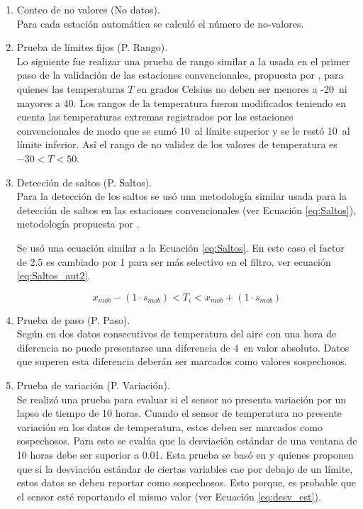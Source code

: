 \begin{enumerate}
\item Conteo de no valores (No datos).\\
	Para cada estación automática se calculó el número de no-valores.

\item Prueba de límites fijos (P. Rango).\\
Lo siguiente fue realizar una prueba de rango similar a la usada en el primer paso de la validación de las estaciones convencionales, propuesta por \citet{estevez2011}, para quienes las temperaturas $T$ en grados Celsius no deben ser menores a -20\celc\ ni mayores a 40\celc. Los rangos de la temperatura fueron modificados teniendo en cuenta las temperaturas extremas registrados por las estaciones convencionales de modo que se sumó 10\celc\ al límite superior y se le restó 10\celc\ al límite inferior. Así el rango de no validez de los valores de temperatura es $-30$\celc $< T < 50$\celc.\\

\item Detección de saltos (P. Saltos).\\
Para la detección de los saltos se usó una metodología similar usada para la detección de saltos en las estaciones convencionales (ver Ecuación \ref{eq:Saltos}), metodología propuesta por \citet{vickers1997}.

Se usó una ecuación similar a la Ecuación \ref{eq:Saltos}. En este caso el factor de 2.5 es cambiado por 1 para ser más selectivo en el filtro, ver ecuación \ref{eq:Saltos_aut2}.

\begin{equation}\label{eq:Saltos_aut2}
	     x_{mob} - (1\cdot{s_{mob}}) < T_{i} < x_{mob} + (1\cdot{s_{mob}}) 
\end{equation}

\item Prueba de paso (P. Paso).\\
Según \citet{estevez2011} en dos datos consecutivos  de temperatura del aire con una hora de diferencia no puede presentarse una diferencia de 4\celc\ en valor absoluto. Datos que superen esta diferencia deberán ser marcados como valores sospechosos.\\

\item Prueba de variación (P. Variación).\\

Se realizó una prueba para evaluar si el sensor no presenta variación por un lapso de tiempo de 10 horas. Cuando el sensor de temperatura no presente variación en los datos de temperatura, estos deben ser marcados como sospechosos. Para esto se evalúa que la desviación estándar de una ventana de 10 horas debe ser superior a 0.01. Esta prueba  se basó en \citet{zahumensky2004} y \citet{Shafer2000} quienes proponen que si la desviación estándar de ciertas variables cae por debajo de un límite, estos datos se deben reportar como sospechosos. Esto porque, es probable que el sensor esté reportando el mismo valor (ver Ecuación \ref{eq:desv_est}).




\end{enumerate}
